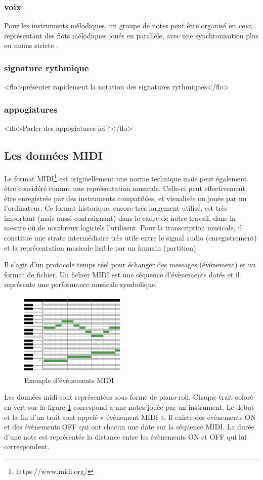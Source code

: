 \subsubsection*{voix}
Pour les instruments mélodiques, un groupe de notes peut être organisé en
\emph{voix}, représentant des flots mélodiques joués en parallèle, avec une
synchronisation plus ou moins stricte \cite{SHIBATA2021262}
\cite{Guiomard-Kagan}.
\subsubsection*{signature rythmique}
<flo>présenter rapidement la notation des signatures rythmiques</flo>
\subsubsection*{appogiatures}
<flo>Parler des appogiatures ici ?</flo>

\subsection*{Les données MIDI}
Le format MIDI\footnote{https://www.midi.org/} est originellement une norme
technique mais peut également être considéré comme une représentation musicale.
Celle-ci peut effectivement être enregistrée par des instruments compatibles,
et visualisée ou jouée par un l’ordinateur. Ce format historique, encore très
largement utilisé, est très important (mais aussi contraignant) dans le cadre
de notre travail, dans la mesure où de nombreux logiciels l'utilisent. Pour la
transcription musicale, il constitue une strate intermédiaire très utile entre
le signal audio (enregistrement) et la représentation musicale lisible par un
humain (partition).

Il s’agit d’un protocole temps réel pour échanger des messages (événement) et
un format de fichier. Un fichier MIDI est une séquence d’évènements datés et il
représente une performance musicale symbolique.

\begin{figure}[h]
	\centering
	\includegraphics[height=40mm, width=50mm]{
    z_images/1_contexte/2_midi_piano.jpg}
	\caption{Exemple d’évènements MIDI}
	\label{piano_roll}
\end{figure}
Les données midi sont représentées sous forme de piano-roll. Chaque trait
coloré en vert sur la figure \ref{piano_roll} correspond à une notes jouée par
un instrument. Le début et la fin d’un trait sont appelé « évènement MIDI ». Il
existe des évènements ON et des évènements OFF qui ont chacun une date sur la
séquence MIDI. La durée d’une note est représentée la distance entre les
évènements ON et OFF qui lui correspondent.\\

